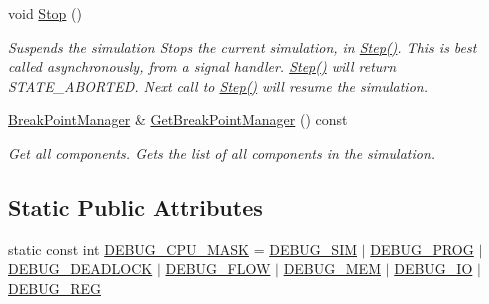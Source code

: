 \begin{DoxyCompactItemize}
void \hyperlink{class_simulator_1_1_kernel_a1c58e6942a54a0abded9988d48890a2c}{Stop} ()
\begin{DoxyCompactList}\small\item\em Suspends the simulation Stops the current simulation, in \hyperlink{class_simulator_1_1_kernel_acacace30804ec07b738e7a24e7a09327}{Step()}. This is best called asynchronously, from a signal handler. \hyperlink{class_simulator_1_1_kernel_acacace30804ec07b738e7a24e7a09327}{Step()} will return S\+T\+A\+T\+E\+\_\+\+A\+B\+O\+R\+T\+E\+D. Next call to \hyperlink{class_simulator_1_1_kernel_acacace30804ec07b738e7a24e7a09327}{Step()} will resume the simulation. \end{DoxyCompactList}\item 
\hyperlink{class_simulator_1_1_break_point_manager}{Break\+Point\+Manager} \& \hyperlink{class_simulator_1_1_kernel_a0ccd0f5f4713ff4abbd382beeff39141}{Get\+Break\+Point\+Manager} () const 
\begin{DoxyCompactList}\small\item\em Get all components. Gets the list of all components in the simulation. \end{DoxyCompactList}\end{DoxyCompactItemize}
\subsection*{Static Public Attributes}
\begin{DoxyCompactItemize}
\item 
static const int \hyperlink{class_simulator_1_1_kernel_a18dcad4f90063352a7815039fc00cb64}{D\+E\+B\+U\+G\+\_\+\+C\+P\+U\+\_\+\+M\+A\+S\+K} = \hyperlink{class_simulator_1_1_kernel_a69dec9d2b2d106e64de63f97301e234aac1d621d783166a33be29e7cdb6ec0637}{D\+E\+B\+U\+G\+\_\+\+S\+I\+M} $\vert$ \hyperlink{class_simulator_1_1_kernel_a69dec9d2b2d106e64de63f97301e234aa4c7b8054a67a2eb6bc2f975026669cf3}{D\+E\+B\+U\+G\+\_\+\+P\+R\+O\+G} $\vert$ \hyperlink{class_simulator_1_1_kernel_a69dec9d2b2d106e64de63f97301e234aaa0bf9e3b8b0cf429c5a04992ab60074f}{D\+E\+B\+U\+G\+\_\+\+D\+E\+A\+D\+L\+O\+C\+K} $\vert$ \hyperlink{class_simulator_1_1_kernel_a69dec9d2b2d106e64de63f97301e234aa69c8d584aaea26b48c2649c5b1c00607}{D\+E\+B\+U\+G\+\_\+\+F\+L\+O\+W} $\vert$ \hyperlink{class_simulator_1_1_kernel_a69dec9d2b2d106e64de63f97301e234aafa59308d321333d469f3a49503f7844a}{D\+E\+B\+U\+G\+\_\+\+M\+E\+M} $\vert$ \hyperlink{class_simulator_1_1_kernel_a69dec9d2b2d106e64de63f97301e234aaae377b10e15f336b5ba5f5876542e54f}{D\+E\+B\+U\+G\+\_\+\+I\+O} $\vert$ \hyperlink{class_simulator_1_1_kernel_a69dec9d2b2d106e64de63f97301e234aadaa52a1a219d6e0f590dfdfb2d3b1352}{D\+E\+B\+U\+G\+\_\+\+R\+E\+G}
\end{DoxyCompactItemize}
